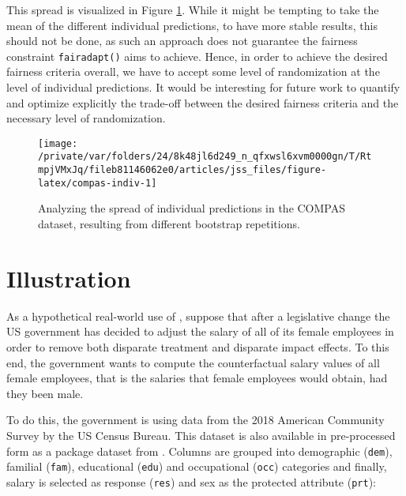 \documentclass[
  nojss]{jss}
\begin{document}
This spread is visualized in Figure \ref{fig:compas-indiv}. While it
might be tempting to take the mean of the different individual
predictions, to have more stable results, this should not be done, as
such an approach does not guarantee the fairness constraint
\texttt{fairadapt()} aims to achieve. Hence, in order to achieve the
desired fairness criteria overall, we have to accept some level of
randomization at the level of individual predictions. It would be
interesting for future work to quantify and optimize explicitly the
trade-off between the desired fairness criteria and the necessary level
of randomization.

\begin{CodeChunk}
\begin{figure}

{\centering \texttt{[image: /private/var/folders/24/8k48jl6d249\_n\_qfxwsl6xvm0000gn/T/RtmpjVMxJq/fileb81146062e0/articles/jss\_files/figure-latex/compas-indiv-1]} 

}

\caption[Analyzing the spread of individual predictions in the COMPAS dataset, resulting from different bootstrap repetitions]{Analyzing the spread of individual predictions in the COMPAS dataset, resulting from different bootstrap repetitions.}\label{fig:compas-indiv}
\end{figure}
\end{CodeChunk}

\hypertarget{illustration}{%
\section{Illustration}\label{illustration}}

As a hypothetical real-world use of , suppose that after
a legislative change the US government has decided to adjust the salary
of all of its female employees in order to remove both disparate
treatment and disparate impact effects. To this end, the government
wants to compute the counterfactual salary values of all female
employees, that is the salaries that female employees would obtain, had
they been male.

To do this, the government is using data from the 2018 American
Community Survey by the US Census Bureau. This dataset is also available
in pre-processed form as a package dataset from . Columns
are grouped into demographic (\texttt{dem}), familial (\texttt{fam}),
educational (\texttt{edu}) and occupational (\texttt{occ}) categories
and finally, salary is selected as response (\texttt{res}) and sex as
the protected attribute (\texttt{prt}):
\end{document}
